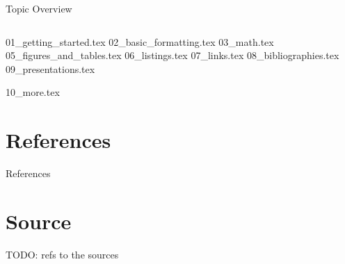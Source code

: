 



\begin{frame}[plain]{Topic Overview}
\begin{columns}[c,onlytextwidth]
\tableofcontents[sections={1-4}]
\tableofcontents[sections={5-8}]
\end{columns}
\end{frame}

{01_getting_started.tex}
{02_basic_formatting.tex}
{03_math.tex}
{05_figures_and_tables.tex}
{06_listings.tex}
{07_links.tex}
{08_bibliographies.tex}
{09_presentations.tex}

\appendix
\beginbackup

{10_more.tex}

\section{References}
\begin{frame}[allowframebreaks]{References}
\printbibliography
\end{frame}

\backupend

\section{Source}
\begin{frame}
   TODO: refs to the sources
\end{frame}


